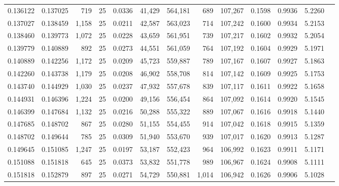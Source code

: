 \begin{tabular}{rrrrrrrrrrrrr}
0.136122 & 0.137025 &   719 &  25 &                                     0.0336 &  41,429 & 564,181 &     689 & 107,267 & 0.1598 & 0.9936 & 5.2260 \\
0.137027 & 0.138459 & 1,158 &  25 &                                     0.0211 &  42,587 & 563,023 &     714 & 107,242 & 0.1600 & 0.9934 & 5.2153 \\
0.138460 & 0.139773 & 1,072 &  25 &                                     0.0228 &  43,659 & 561,951 &     739 & 107,217 & 0.1602 & 0.9932 & 5.2054 \\
0.139779 & 0.140889 &   892 &  25 &                                     0.0273 &  44,551 & 561,059 &     764 & 107,192 & 0.1604 & 0.9929 & 5.1971 \\
0.140889 & 0.142256 & 1,172 &  25 &                                     0.0209 &  45,723 & 559,887 &     789 & 107,167 & 0.1607 & 0.9927 & 5.1863 \\
0.142260 & 0.143738 & 1,179 &  25 &                                     0.0208 &  46,902 & 558,708 &     814 & 107,142 & 0.1609 & 0.9925 & 5.1753 \\
0.143740 & 0.144929 & 1,030 &  25 &                                     0.0237 &  47,932 & 557,678 &     839 & 107,117 & 0.1611 & 0.9922 & 5.1658 \\
0.144931 & 0.146396 & 1,224 &  25 &                                     0.0200 &  49,156 & 556,454 &     864 & 107,092 & 0.1614 & 0.9920 & 5.1545 \\
0.146399 & 0.147684 & 1,132 &  25 &                                     0.0216 &  50,288 & 555,322 &     889 & 107,067 & 0.1616 & 0.9918 & 5.1440 \\
0.147685 & 0.148702 &   867 &  25 &                                     0.0280 &  51,155 & 554,455 &     914 & 107,042 & 0.1618 & 0.9915 & 5.1359 \\
0.148702 & 0.149644 &   785 &  25 &                                     0.0309 &  51,940 & 553,670 &     939 & 107,017 & 0.1620 & 0.9913 & 5.1287 \\
0.149645 & 0.151085 & 1,247 &  25 &                                     0.0197 &  53,187 & 552,423 &     964 & 106,992 & 0.1623 & 0.9911 & 5.1171 \\
0.151088 & 0.151818 &   645 &  25 &                                     0.0373 &  53,832 & 551,778 &     989 & 106,967 & 0.1624 & 0.9908 & 5.1111 \\
0.151818 & 0.152879 &   897 &  25 &                                     0.0271 &  54,729 & 550,881 &   1,014 & 106,942 & 0.1626 & 0.9906 & 5.1028 \\

\end{tabular}
